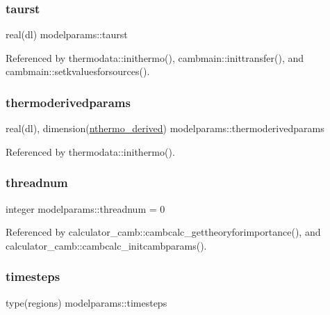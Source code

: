 \subsubsection{\texorpdfstring{taurst}{taurst}}
{\footnotesize\ttfamily real(dl) modelparams\+::taurst}



Referenced by thermodata\+::inithermo(), cambmain\+::inittransfer(), and cambmain\+::setkvaluesforsources().

\mbox{\label{namespacemodelparams_a81091ac7021dd731decc138dc9886329}} 
\subsubsection{\texorpdfstring{thermoderivedparams}{thermoderivedparams}}
{\footnotesize\ttfamily real(dl), dimension(\mbox{\hyperlink{namespacemodelparams_a3763c4095d154f01def46dfce33faffd}{nthermo\+\_\+derived}}) modelparams\+::thermoderivedparams}



Referenced by thermodata\+::inithermo().

\mbox{\label{namespacemodelparams_a33c1b20cf097d69a5c7c3dfda3dab4ab}} 
\subsubsection{\texorpdfstring{threadnum}{threadnum}}
{\footnotesize\ttfamily integer modelparams\+::threadnum = 0}



Referenced by calculator\+\_\+camb\+::cambcalc\+\_\+gettheoryforimportance(), and calculator\+\_\+camb\+::cambcalc\+\_\+initcambparams().

\mbox{\label{namespacemodelparams_ab62c122a08bce8a2c161066a3e0f83cd}} 
\subsubsection{\texorpdfstring{timesteps}{timesteps}}
{\footnotesize\ttfamily type(regions) modelparams\+::timesteps}



